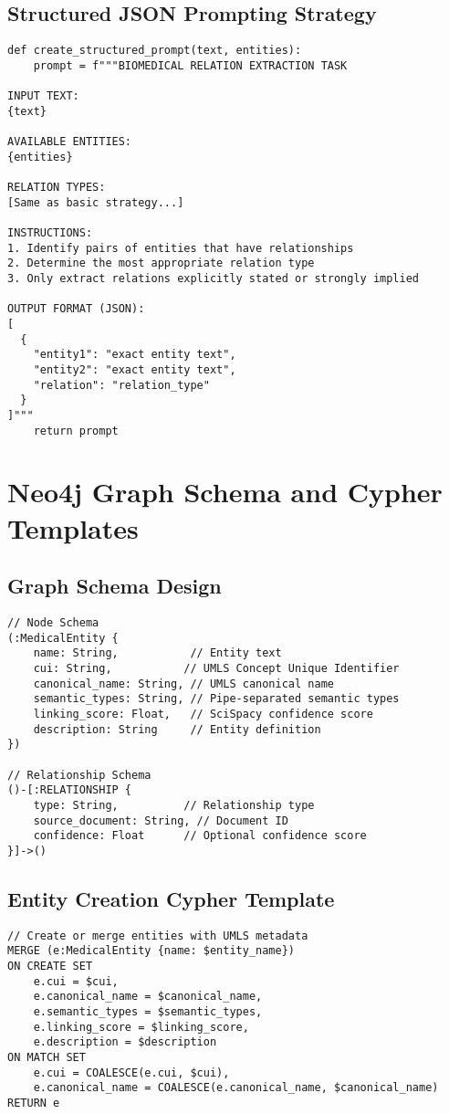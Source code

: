 \subsection{Structured JSON Prompting Strategy}
\begin{verbatim}
def create_structured_prompt(text, entities):
    prompt = f"""BIOMEDICAL RELATION EXTRACTION TASK

INPUT TEXT:
{text}

AVAILABLE ENTITIES:
{entities}

RELATION TYPES:
[Same as basic strategy...]

INSTRUCTIONS:
1. Identify pairs of entities that have relationships
2. Determine the most appropriate relation type
3. Only extract relations explicitly stated or strongly implied

OUTPUT FORMAT (JSON):
[
  {
    "entity1": "exact entity text",
    "entity2": "exact entity text",  
    "relation": "relation_type"
  }
]"""
    return prompt
\end{verbatim}

\section{Neo4j Graph Schema and Cypher Templates}

\subsection{Graph Schema Design}
\begin{verbatim}
// Node Schema
(:MedicalEntity {
    name: String,           // Entity text
    cui: String,           // UMLS Concept Unique Identifier
    canonical_name: String, // UMLS canonical name
    semantic_types: String, // Pipe-separated semantic types
    linking_score: Float,   // SciSpacy confidence score
    description: String     // Entity definition
})

// Relationship Schema
()-[:RELATIONSHIP {
    type: String,          // Relationship type
    source_document: String, // Document ID
    confidence: Float      // Optional confidence score
}]->()
\end{verbatim}

\subsection{Entity Creation Cypher Template}
\begin{verbatim}
// Create or merge entities with UMLS metadata
MERGE (e:MedicalEntity {name: $entity_name})
ON CREATE SET 
    e.cui = $cui,
    e.canonical_name = $canonical_name,
    e.semantic_types = $semantic_types,
    e.linking_score = $linking_score,
    e.description = $description
ON MATCH SET
    e.cui = COALESCE(e.cui, $cui),
    e.canonical_name = COALESCE(e.canonical_name, $canonical_name)
RETURN e
\end{verbatim}

